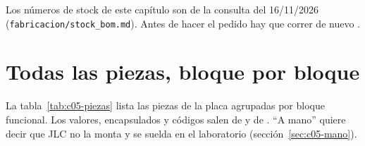 \begin{ojo}
Los números de stock de este capítulo son de la consulta del 16/11/2026 (\nolinkurl{fabricacion/stock_bom.md}). Antes de hacer el pedido hay que correr de nuevo .
\end{ojo}

\section{Todas las piezas, bloque por bloque}\label{sec:c05-lista}

La tabla~\ref{tab:c05-piezas} lista las piezas de la placa agrupadas por bloque funcional. Los valores, encapsulados y códigos salen de  y de . ``A mano'' quiere decir que JLC no la monta y se suelda en el laboratorio (sección~\ref{sec:c05-mano}).

